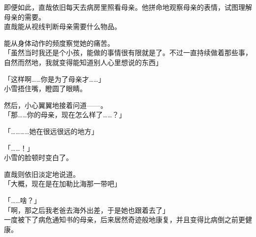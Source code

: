 即便如此，直哉依旧每天去病房里照看母亲。他拼命地观察母亲的表情，试图理解母亲的需要。\\

直哉能从视线判断母亲需要什么物品。

能从身体动作的频度察觉她的痛苦。\\

「虽然当时我还是个小孩，能做的事情很有限就是了。不过一直持续做着那些事，自然而然地，我就变得能知道别人心里想说的东西」

「这样啊……你是为了母亲才……」\\

小雪捂住嘴，瞪圆了眼睛。

然后，小心翼翼地接着问道——。\\

「那……你的母亲，现在怎么样了……？」

「…………她在很远很远的地方」

「……！」\\

小雪的脸顿时变白了。

直哉则依旧淡定地说道。\\

「大概，现在是在加勒比海那一带吧」

「……啥？」\\

「啊，那之后我老爸去海外出差，于是她也跟着去了」\\

一度被下了病危通知书的母亲，后来居然奇迹般地康复，并且变得比病倒之前更健康。

